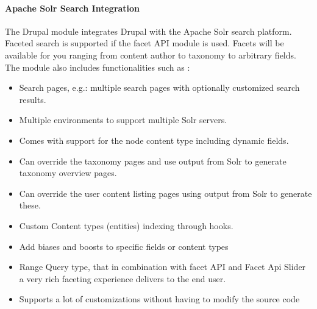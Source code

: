 \paragraph{Apache Solr Search Integration}
The Drupal module integrates Drupal with the Apache Solr search platform. Faceted search is supported if the facet API module is used. Facets will be available for you ranging from content author to taxonomy to arbitrary fields. The module also includes functionalities such as :
\begin{itemize}
  \item Search pages, e.g.: multiple search pages with optionally customized search results.
  \item Multiple environments to support multiple Solr servers.
  \item Comes with support for the node content type including dynamic fields.
  \item Can override the taxonomy pages and use output from Solr to generate taxonomy overview pages.
  \item Can override the user content listing pages using output from Solr to generate these.
  \item Custom Content types (entities) indexing through hooks.
  \item Add biases and boosts to specific fields or content types
  \item Range Query type, that in combination with facet API and Facet Api Slider a very rich faceting experience delivers to the end user.
  \item Supports a lot of customizations without having to modify the source code
\end{itemize}



